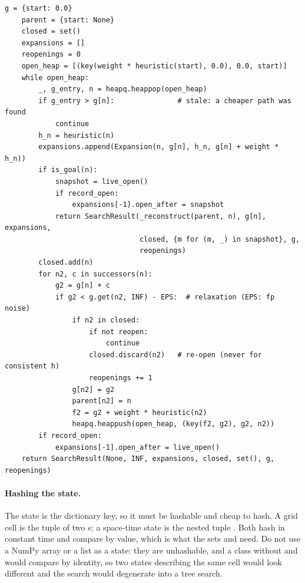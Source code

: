 \begin{lstlisting}[caption={The main loop of \astar (from \code{code/ch04\_astar.py}): a lazy binary heap, a dictionary of $\gcost$ values, a closed set and parent pointers. \code{key()} builds the priority tuple $(\fcost, -\gcost, \mathit{counter})$; \code{EPS} is $10^{-9}$.},label={lst:ch04-astar}]
    g = {start: 0.0}
    parent = {start: None}
    closed = set()
    expansions = []
    reopenings = 0
    open_heap = [(key(weight * heuristic(start), 0.0), 0.0, start)]
    while open_heap:
        _, g_entry, n = heapq.heappop(open_heap)
        if g_entry > g[n]:               # stale: a cheaper path was found
            continue
        h_n = heuristic(n)
        expansions.append(Expansion(n, g[n], h_n, g[n] + weight * h_n))
        if is_goal(n):
            snapshot = live_open()
            if record_open:
                expansions[-1].open_after = snapshot
            return SearchResult(_reconstruct(parent, n), g[n], expansions,
                                closed, {m for (m, _) in snapshot}, g,
                                reopenings)
        closed.add(n)
        for n2, c in successors(n):
            g2 = g[n] + c
            if g2 < g.get(n2, INF) - EPS:  # relaxation (EPS: fp noise)
                if n2 in closed:
                    if not reopen:
                        continue
                    closed.discard(n2)   # re-open (never for consistent h)
                    reopenings += 1
                g[n2] = g2
                parent[n2] = n
                f2 = g2 + weight * heuristic(n2)
                heapq.heappush(open_heap, (key(f2, g2), g2, n2))
        if record_open:
            expansions[-1].open_after = live_open()
    return SearchResult(None, INF, expansions, closed, set(), g, reopenings)
\end{lstlisting}

\paragraph{Hashing the state.}
The state is the dictionary key, so it must be hashable and cheap to hash. A
grid cell is the tuple  of two s; a space-time state is
the nested tuple . Both hash in constant time and compare by
value, which is what the sets  and  need. Do not use a
NumPy array or a list as a state: they are unhashable, and a class without
 and  would compare by identity, so two
states describing the same cell would look different and the search would
degenerate into a tree search.

